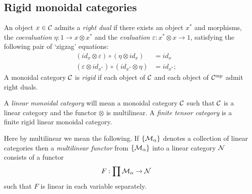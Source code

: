 \documentclass{amsart}
\begin{document}
\subsection{Rigid monoidal categories}


\begin{definition} \label{def:rigid}
	An object $x \in \mathcal C$ admits a {\em right dual} if there exists an object $x^*$ and morphisms, the {\em coevaluation} $\eta: 1 \to x \otimes x^*$ and the {\em evaluation} $\varepsilon: x^* \otimes x \to 1$, satisfying the following pair of `zigzag' equations:
	\begin{align*}
		(id_{x} \otimes \varepsilon  ) \circ (  \eta \otimes id_{x}) &= id_{x} \\
		(\varepsilon \otimes id_{x^*}) \circ (id_{x^*} \otimes \eta) &= id_{x^*};
	\end{align*}
	A monoidal category $\mathcal C$ is {\em rigid} if each object of $\mathcal C$ and each object of $\mathcal C^{\mathrm{mp}}$ admit right duals. 
\end{definition}



\begin{definition}
	A {\em linear monoidal category} will mean a monoidal category $\mathcal C$ such that $\mathcal C$ is a linear category and the functor $\otimes$ is multilinear. A {\em finite tensor category} is a finite rigid linear monoidal category.  
\end{definition}

	Here by multilinear we mean the following.  If $\{\mathcal M_\alpha\}$ denotes a collection of linear categories then a {\em multilinear functor} from $\{\mathcal M_\alpha\}$ into a linear category $\mathcal N$ consists of a functor
\begin{equation*}
	F: \prod \mathcal M_\alpha \to \mathcal N
\end{equation*}
such that $F$ is linear in each variable separately. 


\end{document}

